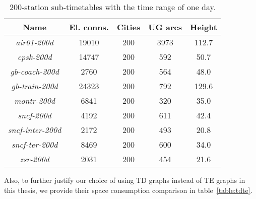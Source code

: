 	\begin{table}[h!]
		\centering
		\small
		\begin{tabular}{c|c|c|c|c}
			\rowcolor{tablehead}
			\textbf{Name} & \textbf{El. conns.} & \textbf{Cities} & \textbf{UG arcs} & \textbf{Height} \\
			\hline
			\textit{air01-200d} & 19010 & 200 & 3973 & 112.7 \\
			\textit{cpsk-200d} & 14747 & 200 & 592 & 50.7 \\
			\textit{gb-coach-200d} & 2760 & 200 & 564 & 48.0 \\
			\textit{gb-train-200d} & 24323 & 200 & 792 & 129.6 \\
			\textit{montr-200d} & 6841 & 200 & 320 & 35.0 \\
			\textit{sncf-200d} & 4192 & 200 & 611 & 42.4 \\		
			\textit{sncf-inter-200d} & 2172 & 200 & 493 & 20.8 \\
			\textit{sncf-ter-200d} & 8469 & 200 & 600 & 34.0 \\
			\textit{zsr-200d} & 2031 & 200 & 454 & 21.6 \\
		\end{tabular}
		\caption{\label{table:tt_200mainpr} 200-station sub-timetables with the time range of one day.}
		\normalsize
	\end{table}
	
	\noindent Also, to further justify our choice of using TD graphs instead of TE graphs in this thesis, we provide their space consumption comparison in table~\ref{table:tdte}. \\
	
